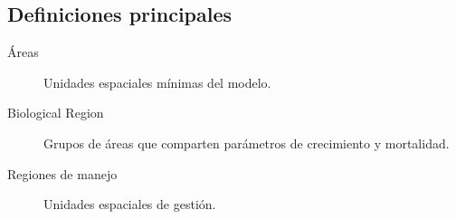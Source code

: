		\subsection{Definiciones principales}
		
		\begin{description}
		\item[Áreas] Unidades espaciales mínimas del modelo.
		\item[Biological Region] Grupos de áreas que comparten parámetros de crecimiento y mortalidad. 
		\item[Regiones de manejo] Unidades espaciales de gestión. 		
		\end{description}

	
